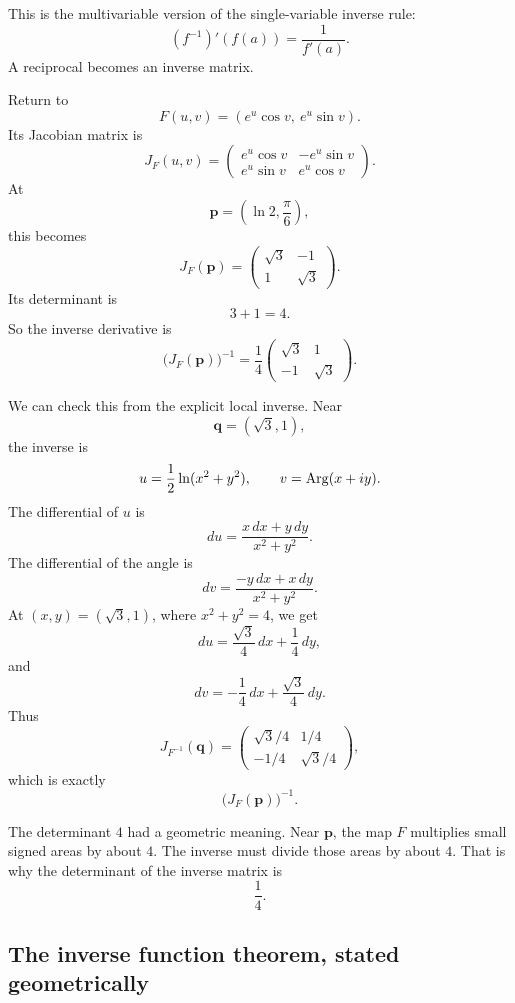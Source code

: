 This is the multivariable version of the single-variable inverse rule:
\[
    (f^{-1})'(f(a))=\frac{1}{f'(a)}.
\]
A reciprocal becomes an inverse matrix.

\begin{example}
Return to
\[
    F(u,v)=(e^u\cos v,\ e^u\sin v).
\]
Its Jacobian matrix is
\[
    J_F(u,v)
    =
    \begin{pmatrix}
        e^u\cos v & -e^u\sin v\\
        e^u\sin v & e^u\cos v
    \end{pmatrix}.
\]
At
\[
    \mathbf p=\left(\ln2,\frac{\pi}{6}\right),
\]
this becomes
\[
    J_F(\mathbf p)
    =
    \begin{pmatrix}
        \sqrt3 & -1\\
        1 & \sqrt3
    \end{pmatrix}.
\]
Its determinant is
\[
    3+1=4.
\]
So the inverse derivative is
\[
    \bigl(J_F(\mathbf p)\bigr)^{-1}
    =
    \frac14
    \begin{pmatrix}
        \sqrt3 & 1\\
        -1 & \sqrt3
    \end{pmatrix}.
\]

We can check this from the explicit local inverse.  Near
\[
    \mathbf q=(\sqrt3,1),
\]
the inverse is
\[
    u=\frac12\ln(x^2+y^2),
    \qquad
    v=\operatorname{Arg}(x+iy).
\]
The differential of \(u\) is
\[
    du=\frac{x\,dx+y\,dy}{x^2+y^2}.
\]
The differential of the angle is
\[
    dv=\frac{-y\,dx+x\,dy}{x^2+y^2}.
\]
At \((x,y)=(\sqrt3,1)\), where \(x^2+y^2=4\), we get
\[
    du=\frac{\sqrt3}{4}\,dx+\frac14\,dy,
\]
and
\[
    dv=-\frac14\,dx+\frac{\sqrt3}{4}\,dy.
\]
Thus
\[
    J_{F^{-1}}(\mathbf q)
    =
    \begin{pmatrix}
        \sqrt3/4 & 1/4\\
        -1/4 & \sqrt3/4
    \end{pmatrix},
\]
which is exactly
\[
    \bigl(J_F(\mathbf p)\bigr)^{-1}.
\]
\end{example}

The determinant \(4\) had a geometric meaning.  Near \(\mathbf p\), the map \(F\)
multiplies small signed areas by about \(4\).  The inverse must divide those areas by
about \(4\).  That is why the determinant of the inverse matrix is
\[
    \frac14.
\]

\subsection{The inverse function theorem, stated geometrically}

